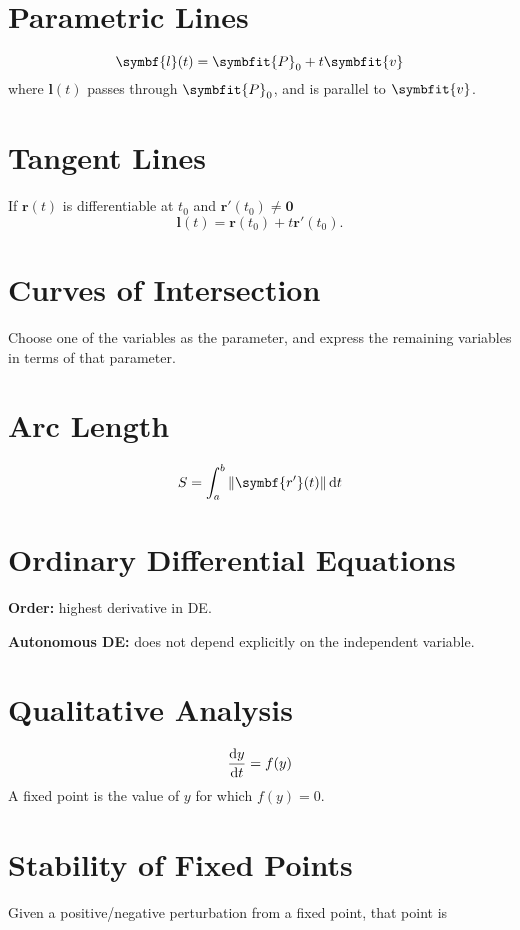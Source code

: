 \documentclass{article}
\begin{document}
\begin{multicols}{3}
    \section*{Parametric Lines}
    \begin{equation*}
        \symbf{l}(t) = \symbfit{P}_0 + t\symbfit{v}
    \end{equation*}
    where \(\symbf{l}(t)\) passes through \(\symbfit{P}_0\), and is parallel to \(\symbfit{v}\).
    \section*{Tangent Lines}
    If \(\symbf{r}(t)\) is differentiable at
    \(t_0\) and \(\symbf{r'}(t_0)\ne\symbf{0}\)
    \begin{equation*}
        \symbf{l}(t) = \symbf{r}(t_0)+t\symbf{r'}(t_0).
    \end{equation*}
    \section*{Curves of Intersection}
    Choose one of the variables as the parameter, and express the remaining variables in terms of that parameter.
    \section*{Arc Length}
    \begin{equation*}
        S = \int_a^b \norm{\symbf{r'}(t)} \dd{t}
    \end{equation*}
    \section*{Ordinary Differential Equations}
    \textbf{Order:} highest derivative in DE\@.

    \textbf{Autonomous DE:} does not depend explicitly on the independent variable.
    \section*{Qualitative Analysis}
    \begin{equation*}
        \dv{y}{t} = f(y)
    \end{equation*}
    A fixed point is the value of \(y\) for which \(f(y) = 0\).
    \section*{Stability of Fixed Points}
    Given a positive/negative perturbation from a fixed point, that point is


\end{multicols}
\end{document}
